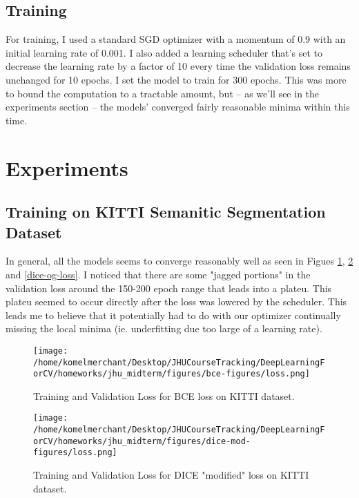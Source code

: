 \documentclass[Location Location Location! : Exploring Image Segmentation Problem In Urban Driving Scenarios]{IEEEtran}
\begin{document}
\subsection{Training}

For training, I used a standard SGD optimizer with a momentum of 0.9 with an initial learning rate of 0.001. I also added a learning scheduler that's set to decrease the learning rate by a factor of 10 every time the validation loss remains unchanged for 10 epochs. I set the model to train for 300 epochs. This was more to bound the computation to a tractable amount, but -- as we'll see in the experiments section -- the models' converged fairly reasonable minima within this time. 



\section{Experiments}


\subsection{Training on KITTI Semanitic Segmentation Dataset}

In general, all the models seems to converge reasonably well as seen in Figues \ref{bce-loss}, \ref{dice-mod-loss} and \ref{dice-og-loss}. I noticed that there are some "jagged portions" in the validation loss around the 150-200 epoch range that leads into a plateu. This plateu seemed to occur directly after the loss was lowered by the scheduler. This leads me to believe that it potentially had to do with our optimizer continually missing the local minima (ie. underfitting due too large of a learning rate).


\begin{figure}[htbp]
\centerline{\texttt{[image: /home/komelmerchant/Desktop/JHUCourseTracking/DeepLearningForCV/homeworks/jhu\_midterm/figures/bce-figures/loss.png]}}
\caption{Training and Validation Loss for BCE loss on KITTI dataset.}
\label{bce-loss}
\end{figure}


\begin{figure}[htbp]
\centerline{\texttt{[image: /home/komelmerchant/Desktop/JHUCourseTracking/DeepLearningForCV/homeworks/jhu\_midterm/figures/dice-mod-figures/loss.png]}}
\caption{Training and Validation Loss for DICE "modified" loss on KITTI dataset.}
\label{dice-mod-loss}
\end{figure}
\end{document}
